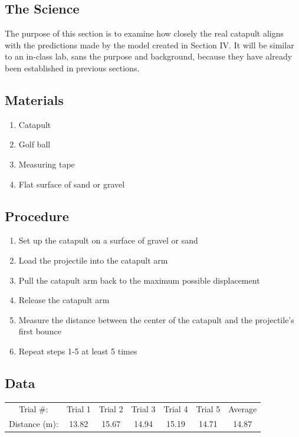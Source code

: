 \documentclass[10pt]{article}
\begin{document}
  \begin{flushleft}
  \section{The Science}
    
    The purpose of this section is to examine how closely the real catapult aligns with the predictions made by the model created in Section IV. 
    It will be similar to an in-class lab, sans the purpose and background, because they have already been established in previous sections.
    
    \subsection{Materials}
      \begin{enumerate}
        \item Catapult
        \item Golf ball
        \item Measuring tape
        \item Flat surface of sand or gravel
      \end{enumerate} 

    \subsection{Procedure}
      \begin{enumerate}
        \item Set up the catapult on a surface of gravel or sand
        \item Load the projectile into the catapult arm
        \item Pull the catapult arm back to the maximum possible displacement
        \item Release the catapult arm
        \item Measure the distance between the center of the catapult and the projectile's first bounce
        \item Repeat steps 1-5 at least 5 times
      \end{enumerate}

    \subsection{Data}   
    
      \begin{center}
      \begin{tabular}{ |c|c|c|c|c|c|c| } 
       \hline
             Trial \#: & Trial 1 & Trial 2 & Trial 3 & Trial 4 & Trial 5 & Average \\ 
             Distance (m): & 13.82 & 15.67 & 14.94 & 15.19 & 14.71 & 14.87 \\ 
       \hline
      \end{tabular}
      \end{center}


\end{flushleft}
\end{document}
